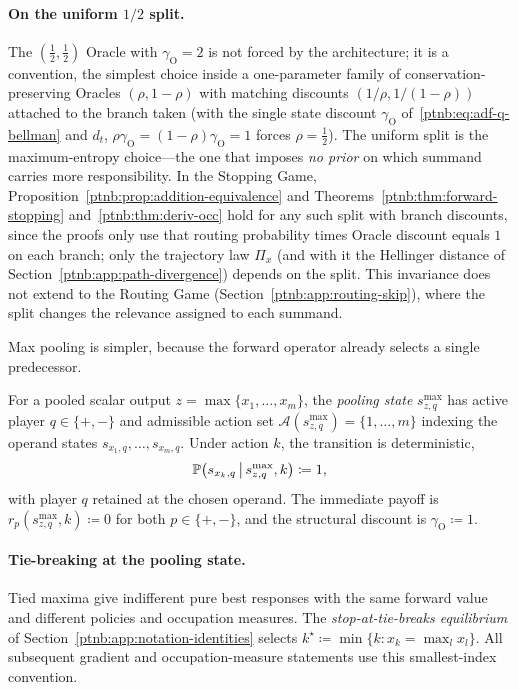 \paragraph{On the uniform $1/2$ split.}
The $(\tfrac{1}{2}, \tfrac{1}{2})$ Oracle with $\gamma_{\mathrm{O}} = 2$ is not forced by the
architecture; it is a convention, the simplest choice inside a one-parameter family of
conservation-preserving Oracles $(\rho, 1-\rho)$ with matching discounts $(1/\rho, 1/(1-\rho))$
attached to the branch taken (with the single state discount $\gamma_{\mathrm{O}}$
of~\eqref{ptnb:eq:adf-q-bellman} and $d_t$, $\rho\gamma_{\mathrm{O}}=(1-\rho)\gamma_{\mathrm{O}}=1$
forces $\rho=\tfrac12$). The uniform split is the maximum-entropy choice---the one that imposes
\emph{no prior} on which summand carries more responsibility. In the Stopping Game,
Proposition~\ref{ptnb:prop:addition-equivalence} and Theorems~\ref{ptnb:thm:forward-stopping}
and~\ref{ptnb:thm:deriv-occ} hold for any such split with branch discounts, since the proofs only use
that routing probability times Oracle discount equals $1$ on each branch; only the trajectory law
$\Pi_x$ (and with it the Hellinger distance of Section~\ref{ptnb:app:path-divergence}) depends on the
split. This invariance does not extend to the Routing Game (Section~\ref{ptnb:app:routing-skip}), where
the split changes the relevance assigned to each summand.

Max pooling is simpler, because the forward operator already selects a single predecessor.

\begin{definition}\label{ptnb:def:maxpool-subgame}
For a pooled scalar output $z = \max\{x_1, \dots, x_m\}$, the \emph{pooling state} $s_{z,q}^{\max}$
has active player $q \in \{+, -\}$ and admissible action set $\mathcal{A}(s_{z,q}^{\max}) = \{1,
    \dots, m\}$ indexing the operand states $s_{x_1,q}, \dots, s_{x_m,q}$. Under action $k$, the
transition is deterministic,
\begin{align}
    \P\bigl(s_{x_k,q} \,\big|\, s_{z,q}^{\max}, k\bigr) \coloneqq 1,
\end{align}
with player $q$ retained at the chosen operand. The immediate payoff is $r_p(s_{z,q}^{\max}, k)
    \coloneqq 0$ for both $p \in \{+,-\}$, and the structural discount is $\gamma_{\mathrm{O}}
    \coloneqq 1$.
\end{definition}

\paragraph{Tie-breaking at the pooling state.}
Tied maxima give indifferent pure best responses with the same forward value and different
policies and occupation measures. The \emph{stop-at-tie-breaks equilibrium} of
Section~\ref{ptnb:app:notation-identities} selects $k^\star\coloneqq\min\{k:x_k=\max_l x_l\}$.
All subsequent gradient and occupation-measure statements use this smallest-index convention.

